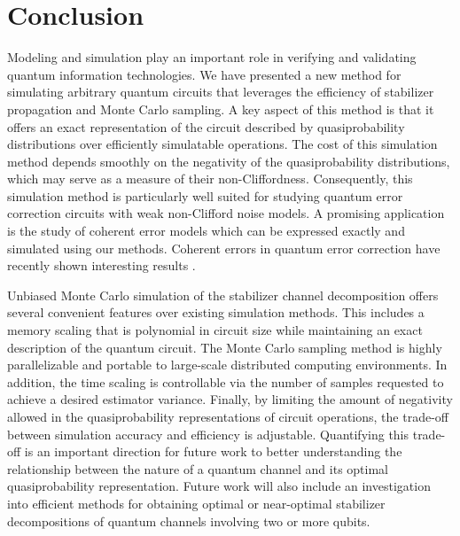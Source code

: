 \documentclass[twocolumn,pra]{revtex4}
\begin{document}
\section{Conclusion} 
\label{sec:conc}
Modeling and simulation play an important role in verifying and validating quantum information technologies. We have presented a new method for simulating arbitrary quantum circuits that leverages the efficiency of stabilizer propagation and Monte Carlo sampling. A key aspect of this method is that it offers an exact representation of the circuit described by quasiprobability distributions over efficiently simulatable operations. The cost of this simulation method depends smoothly on the negativity of the quasiprobability distributions, which may serve as a measure of their non-Cliffordness. Consequently, this simulation method is particularly well suited for studying quantum error correction circuits with weak non-Clifford noise models. A promising application is the study of coherent error models which can be expressed exactly and simulated using our methods. Coherent errors in quantum error correction have recently shown interesting results \cite{Darmawan2016,Suzuki2017,Barnes2017}.
\par
Unbiased Monte Carlo simulation of the stabilizer channel decomposition offers several convenient features over existing simulation methods. This includes a memory scaling that is polynomial in circuit size while maintaining an exact description of the quantum circuit. The Monte Carlo sampling method is highly parallelizable and portable to large-scale distributed computing environments. In addition, the time scaling is controllable via the number of samples requested to achieve a desired estimator variance. Finally, by limiting the amount of negativity allowed in the quasiprobability representations of circuit operations, the trade-off between simulation accuracy and efficiency is adjustable. Quantifying this trade-off is an important direction for future work to better understanding the relationship between the nature of a quantum channel and its optimal quasiprobability representation. Future work will also include an investigation into efficient methods for obtaining optimal or near-optimal stabilizer decompositions of quantum channels involving two or more qubits.
\end{document}
